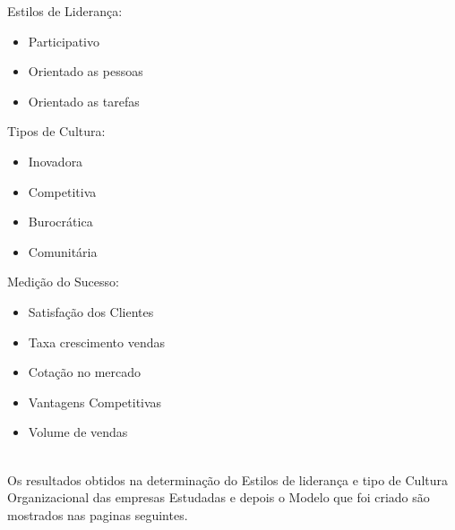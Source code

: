 \begin{minipage}[t]{.3\linewidth}
\quad Estilos de Liderança:
\begin{itemize}
\item Participativo
\item Orientado as pessoas
\item Orientado as tarefas
\end{itemize}
\end{minipage}
\begin{minipage}[t]{.3\linewidth}
\quad Tipos de Cultura:
\begin{itemize}
\item Inovadora
\item Competitiva
\item Burocrática
\item Comunitária
\end{itemize}
\end{minipage}
\begin{minipage}[t]{.3\linewidth}
\quad Medição do Sucesso:
\begin{itemize}
\item Satisfação dos Clientes
\item Taxa crescimento vendas
\item Cotação no mercado
\item Vantagens Competitivas
\item Volume de vendas
\end{itemize}
\end{minipage}
\vspace{2cm}\\


Os resultados obtidos na determinação do Estilos de liderança e tipo de Cultura Organizacional das empresas Estudadas e depois o Modelo que foi criado são mostrados nas paginas seguintes.\\

